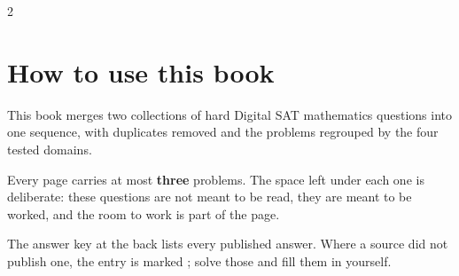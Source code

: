 \documentclass[11pt,openany]{book}
\begin{document}


\satwatermark
\pagestyle{satbody}
\frontmatter

\noindent
{}
\par\medskip

\begin{multicols}{2}
\setlength{\columnsep}{22pt}
\raggedcolumns
\makeatletter
{}
\makeatother
\end{multicols}

\clearpage
\section*{How to use this book}
This book merges two collections of hard Digital SAT mathematics
questions into one sequence, with duplicates removed and the problems
regrouped by the four tested domains.

Every page carries at most \textbf{three} problems. The space left under
each one is deliberate: these questions are not meant to be read, they
are meant to be worked, and the room to work is part of the page.

The answer key at the back lists every published answer. Where a source
did not publish one, the entry is marked \textemdash; solve those and
fill them in yourself.

\mainmatter
{}


\end{document}
